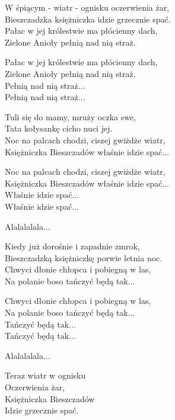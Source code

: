 \begin{text}

    W śpiącym - wiatr - ognisku oczerwienia żar,\\
    Bieszczadzka księżniczka idzie grzecznie spać.\\
    Pałac w jej królestwie ma płócienny dach,\\
    Zielone Anioły pełnią nad nią straż.

    \vin Pałac w jej królestwie ma płócienny dach,\\
    \vin Zielone Anioły pełnią nad nią straż.\\
    \vin Pełnią nad nią straż...\\
    \vin Pełnią nad nią straż...

    Tuli się do mamy, mruży oczka swe,\\
    Tata kołysankę cicho nuci jej.\\
    Noc na palcach chodzi, ciszej gwiżdże wiatr,\\
    Księżniczka Bieszczadów właśnie idzie spać...

    \vin Noc na palcach chodzi, ciszej gwiżdże wiatr,\\
    \vin Księżniczka Bieszczadów właśnie idzie spać...\\
    \vin Właśnie idzie spać...\\
    \vin Właśnie idzie spać...

    \vin Alalalalala...

    Kiedy już dorośnie i zapadnie zmrok,\\
    Bieszczadzką księżniczkę porwie letnia noc.\\
    Chwyci dłonie chłopca i pobiegną w las,\\
    Na polanie boso tańczyć będą tak...

    \vin Chwyci dłonie chłopca i pobiegną w las,\\
    \vin Na polanie boso tańczyć będą tak...\\
    \vin Tańczyć będą tak...\\
    \vin Tańczyć będą tak...

    \vin Alalalalala...

    Teraz wiatr w ognisku\\
    Oczerwienia żar,\\
    Księżniczka Bieszczadów\\
    Idzie grzecznie spać.
\end{text}
